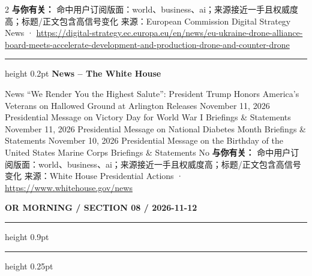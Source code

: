 \documentclass[10.5pt]{ctexart}
\begin{document}
\begin{multicols}{2}
\textbf{与你有关：} 命中用户订阅版面：world、business、ai；来源接近一手且权威度高；标题/正文包含高信号变化
{\footnotesize\color{ormuted} 来源：European Commission Digital Strategy News · \url{https://digital-strategy.ec.europa.eu/en/news/eu-ukraine-drone-alliance-board-meets-accelerate-development-and-production-drone-and-counter-drone}}
\vspace{2mm}
\hrule height 0.2pt
\vspace{2mm}
{\large\bfseries News – The White House}\par
News “We Render You the Highest Salute”: President Trump Honors America’s Veterans on Hallowed Ground at Arlington Releases November 11, 2026 Presidential Message on Victory Day for World War I Briefings \& Statements November 11, 2026 Presidential Message on National Diabetes Month Briefings \& Statements November 10, 2026 Presidential Message on the Birthday of the United States Marine Corps Briefings \& Statements No
\textbf{与你有关：} 命中用户订阅版面：world、business、ai；来源接近一手且权威度高；标题/正文包含高信号变化
{\footnotesize\color{ormuted} 来源：White House Presidential Actions · \url{https://www.whitehouse.gov/news}}
\end{multicols}
\newpage
{\small\bfseries OR MORNING / SECTION 08 / 2026-11-12}
\vspace{2mm}
\hrule height 0.9pt
\vspace{1.5mm}
\hrule height 0.25pt
\vspace{4mm}
\end{document}
